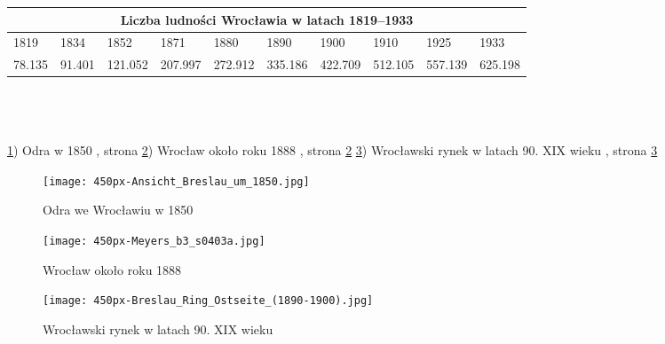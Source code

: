 \documentclass{article}
\begin{document}
\newline\begin{tabular}{ |p{1cm}||p{1cm}|p{1cm}|p{1cm}||p{1cm}||p{1cm}|p{1cm}|p{1cm}||p{1cm}|p{1cm}| }
 \hline
 \multicolumn{10}{|c|}{Liczba ludności Wrocławia w latach 1819–1933} \\
 \hline
 1819&1834&1852&1871&1880&1890&1900&1910&1925&1933\\
 \hline
78.135 & 91.401 & 121.052 & 207.997 & 272.912 & 335.186 & 422.709 & 512.105 & 557.139 & 625.198\\
 \hline
\end{tabular}\\\\
\\
\newline\ref{fig:odrawro}) Odra w 1850 , strona \pageref{fig:odrawro}
\newline\ref{fig:wro1888}) Wrocław około roku 1888 , strona \ref{fig:wro1888}
\newline\ref{fig:wrorynek}) Wrocławski rynek w latach 90. XIX wieku , strona \ref{fig:wrorynek}
\begin{figure}[h!]
\centering
\texttt{[image: 450px-Ansicht\_Breslau\_um\_1850.jpg]}
\caption{Odra we Wrocławiu w 1850}
\label{fig:odrawro}
\end{figure}
\begin{figure}[h!]
\centering
\texttt{[image: 450px-Meyers\_b3\_s0403a.jpg]}
\caption{Wrocław około roku 1888}
\label{fig:wro1888}
\end{figure}
\begin{figure}[h!]
\centering
\texttt{[image: 450px-Breslau\_Ring\_Ostseite\_(1890-1900).jpg]}
\caption{Wrocławski rynek w latach 90. XIX wieku}
\label{fig:wrorynek}
\end{figure}
\end{document}
